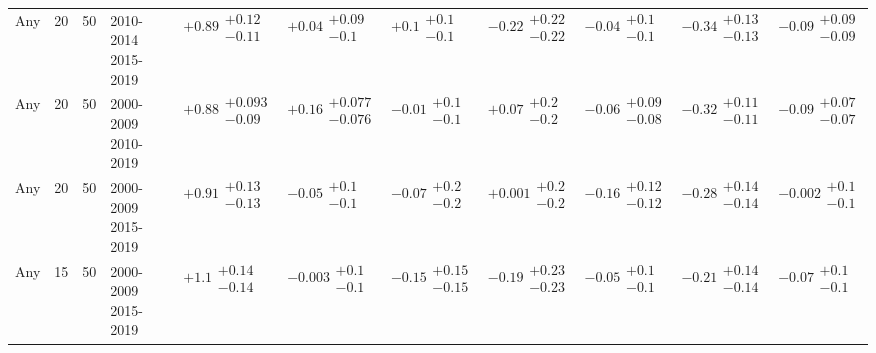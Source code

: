 \begin{table}[H]
\begin{tabular}{lrrllllllll}
Any & 20 & 50 & \makecell{2010-2014 \\ 2015-2019} & $\bm{+0.89}\substack{+0.12 \\ -0.11}$ & $+0.04\substack{+0.09 \\ -0.1}$ & $+0.1\substack{+0.1 \\ -0.1}$ & $\bm{-0.22}\substack{+0.22 \\ -0.22}$ & $-0.04\substack{+0.1 \\ -0.1}$ & $\bm{-0.34}\substack{+0.13 \\ -0.13}$ & $\bm{-0.09}\substack{+0.09 \\ -0.09}$ \\
Any & 20 & 50 & \makecell{2000-2009 \\ 2010-2019} & $\bm{+0.88}\substack{+0.093 \\ -0.09}$ & $\bm{+0.16}\substack{+0.077 \\ -0.076}$ & $-0.01\substack{+0.1 \\ -0.1}$ & $+0.07\substack{+0.2 \\ -0.2}$ & $-0.06\substack{+0.09 \\ -0.08}$ & $\bm{-0.32}\substack{+0.11 \\ -0.11}$ & $\bm{-0.09}\substack{+0.07 \\ -0.07}$ \\
Any & 20 & 50 & \makecell{2000-2009 \\ 2015-2019} & $\bm{+0.91}\substack{+0.13 \\ -0.13}$ & $-0.05\substack{+0.1 \\ -0.1}$ & $-0.07\substack{+0.2 \\ -0.2}$ & $+0.001\substack{+0.2 \\ -0.2}$ & $\bm{-0.16}\substack{+0.12 \\ -0.12}$ & $\bm{-0.28}\substack{+0.14 \\ -0.14}$ & $-0.002\substack{+0.1 \\ -0.1}$ \\
Any & 15 & 50 & \makecell{2000-2009 \\ 2015-2019} & $\bm{+1.1}\substack{+0.14 \\ -0.14}$ & $-0.003\substack{+0.1 \\ -0.1}$ & $-0.15\substack{+0.15 \\ -0.15}$ & $-0.19\substack{+0.23 \\ -0.23}$ & $-0.05\substack{+0.1 \\ -0.1}$ & $\bm{-0.21}\substack{+0.14 \\ -0.14}$ & $-0.07\substack{+0.1 \\ -0.1}$ \\

\end{tabular}
\end{table}
